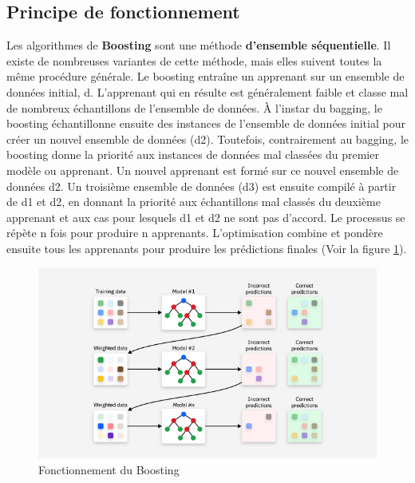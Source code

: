 \subsection*{Principe de fonctionnement}
Les algorithmes de \textbf{Boosting} sont une méthode \textbf{d'ensemble séquentielle}. Il existe de nombreuses variantes de cette méthode, mais elles suivent toutes la même procédure générale. Le boosting entraîne un apprenant sur un ensemble de données initial, d. L'apprenant qui en résulte est généralement faible et classe mal de nombreux échantillons de l'ensemble de données. À l'instar du bagging, le boosting échantillonne ensuite des instances de l'ensemble de données initial pour créer un nouvel ensemble de données (d2). Toutefois, contrairement au bagging, le boosting donne la priorité aux instances de données mal classées du premier modèle ou apprenant. Un nouvel apprenant est formé sur ce nouvel ensemble de données d2. Un troisième ensemble de données (d3) est ensuite compilé à partir de d1 et d2, en donnant la priorité aux échantillons mal classés du deuxième apprenant et aux cas pour lesquels d1 et d2 ne sont pas d'accord. Le processus se répète n fois pour produire n apprenants. L'optimisation combine et pondère ensuite tous les apprenants pour produire les prédictions finales (Voir la figure \ref{fig:boosting}).
\begin{figure}[h!]
	\centering
	\includegraphics[width=0.9\linewidth]{images/boosting}
	\caption{Fonctionnement du Boosting~\cite{ensIBM}}
	\label{fig:boosting}
\end{figure}


